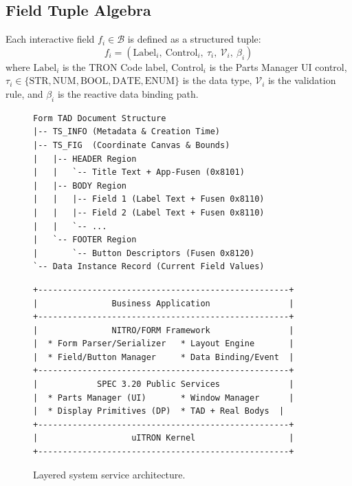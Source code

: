 \documentclass[10pt,journal,compsoc,twocolumn]{article}
\begin{document}
\subsection{Field Tuple Algebra}
Each interactive field $f_i \in \mathcal{B}$ is defined as a structured tuple:
\begin{equation}
f_i = \left( \text{Label}_i,\ \text{Control}_i,\ \tau_i,\ \mathcal{V}_i,\ \beta_i \right)
\end{equation}
where $\text{Label}_i$ is the TRON Code label, $\text{Control}_i$ is the Parts Manager UI control, $\tau_i \in \{ \text{STR}, \text{NUM}, \text{BOOL}, \text{DATE}, \text{ENUM} \}$ is the data type, $\mathcal{V}_i$ is the validation rule, and $\beta_i$ is the reactive data binding path.

\begin{figure}[htbp]
\centering
\begin{minipage}{0.48\textwidth}
\begin{lstlisting}
Form TAD Document Structure
|-- TS_INFO (Metadata & Creation Time)
|-- TS_FIG  (Coordinate Canvas & Bounds)
|   |-- HEADER Region
|   |   `-- Title Text + App-Fusen (0x8101)
|   |-- BODY Region
|   |   |-- Field 1 (Label Text + Fusen 0x8110)
|   |   |-- Field 2 (Label Text + Fusen 0x8110)
|   |   `-- ...
|   `-- FOOTER Region
|       `-- Button Descriptors (Fusen 0x8120)
`-- Data Instance Record (Current Field Values)
\end{lstlisting}
\caption{TAD physical segment layout of a NITRO/FORM.}
\label{fig:tad_structure}
\end{minipage}\hfill
\begin{minipage}{0.48\textwidth}
\begin{lstlisting}
+---------------------------------------------------+
|               Business Application                |
+---------------------------------------------------+
|               NITRO/FORM Framework                |
|  * Form Parser/Serializer   * Layout Engine       |
|  * Field/Button Manager     * Data Binding/Event  |
+---------------------------------------------------+
|            SPEC 3.20 Public Services              |
|  * Parts Manager (UI)       * Window Manager      |
|  * Display Primitives (DP)  * TAD + Real Bodys  |
+---------------------------------------------------+
|                   uITRON Kernel                   |
+---------------------------------------------------+
\end{lstlisting}
\caption{Layered system service architecture.}
\label{fig:service_arch}
\end{minipage}
\end{figure}
\end{document}
